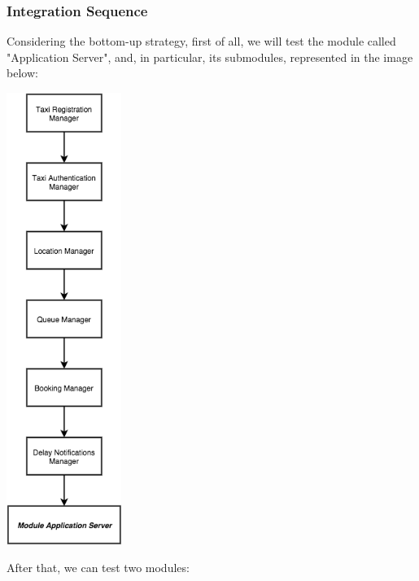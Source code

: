 \subsubsection{Integration Sequence}
Considering the bottom-up strategy, first of all, we will test the module called "Application Server", and, in particular, its submodules, represented in the image below:
    \begin{center}
	    \includegraphics[width=0.28\textwidth]{./images/ModuleApplicationServer.png}~\\[1.5cm] 
    \end{center}	
After that, we can test two modules:
